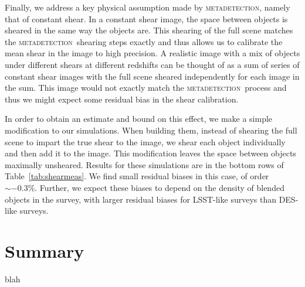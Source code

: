 \documentclass[fleqn,useAMS,usenatbib]{mnras}
\newcommand{\mdet}{\textsc{metadetection}}
\begin{document}
Finally, we address a key physical assumption made by \mdet, namely that of constant
shear. In a constant shear image, the space between objects is sheared in the
same way the objects are. This shearing of the full scene matches the \mdet\
shearing steps exactly and thus allows us to calibrate the mean shear in the
image to high precision. A realistic image with a mix of objects under different
shears at different redshifts can be thought of as a sum of series of constant
shear images with the full scene sheared independently for each image in the sum.
This image would not exactly match the \mdet\ process and thus we might expect
some residual bias in the shear calibration.

In order to obtain an estimate and bound on this effect, we make a simple
modification to our simulations. When building them, instead of shearing the
full scene to impart the true shear to the image, we shear each object
individually and then add it to the image. This modification leaves the space
between objects maximally unsheared. Results for these simulations are in the
bottom rows of Table~\ref{tab:shearmeas}. We find small residual biases in this
case, of order $\sim-0.3\%$. Further, we expect these biases to depend on
the density of blended objects in the survey, with larger residual biases
for LSST-like surveys than DES-like surveys.

\section{Summary}
blah



\end{document}
